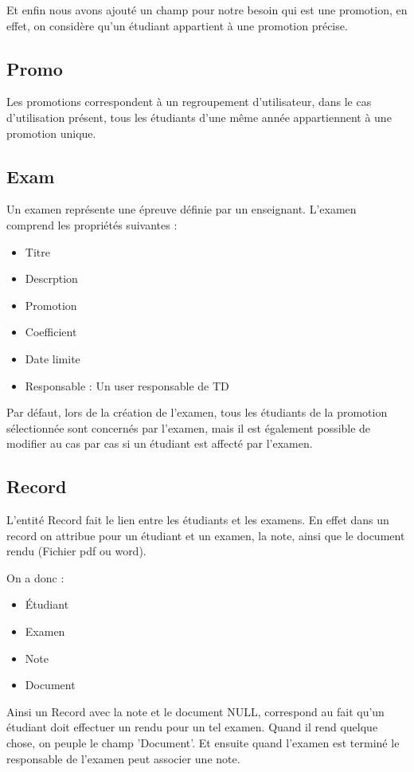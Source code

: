 \documentclass{report}
\begin{document}
      Et enfin nous avons ajouté un champ pour notre besoin qui est une
      promotion, en effet, on considère qu'un étudiant appartient à une
      promotion précise.

    \subsection{Promo}
      Les promotions correspondent à un regroupement d'utilisateur, dans le cas d'utilisation présent, tous les étudiants d'une même année 
      appartiennent à une promotion unique.

    \subsection{Exam}
      Un examen représente une épreuve définie par un enseignant. L'examen 
			comprend les propriétés suivantes :
			\begin{itemize}
				\item{Titre}
				\item{Descrption}
				\item{Promotion}
				\item{Coefficient}
				\item{Date limite}
				\item{Responsable : Un user responsable de TD}
			\end{itemize}
			Par défaut, lors de la création de l'examen, tous les étudiants de la promotion sélectionnée sont concernés par l'examen, mais il est également possible de modifier au cas par cas si un étudiant est affecté par l'examen.
    \subsection{Record}
			L'entité Record fait le lien entre les étudiants et les examens. En effet dans un record on attribue pour un étudiant et un examen, la note, ainsi que le document rendu (Fichier pdf ou word).

			On a donc :
			\begin{itemize}
				\item{Étudiant}
				\item{Examen}
				\item{Note}
				\item{Document}
			\end{itemize}

			Ainsi un Record avec la note et le document NULL, correspond au fait qu'un étudiant doit effectuer un rendu pour un tel examen. Quand il rend quelque chose, on peuple le champ 'Document'. Et ensuite quand l'examen est terminé le responsable de l'examen peut associer une note.
\end{document}

